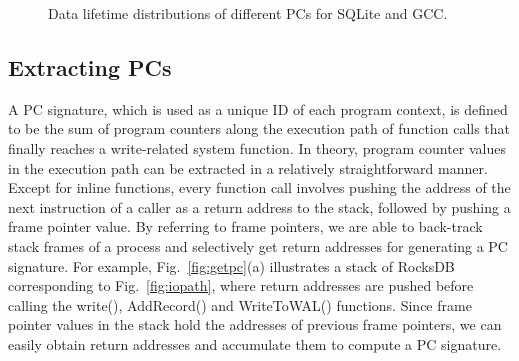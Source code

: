 \begin{figure}[t]
\centering
\hfill
	\hspace{2pt}
\hfill
\vspace{7pt}
	\hspace{2pt}
\caption{Data lifetime distributions of different PCs for SQLite and GCC.} 
\label{fig:updating_PCs}
\end{figure}


\subsection{Extracting PCs}
A PC signature, which is used as a unique ID of each program context,
is defined
to be the sum of program counters along the execution path of function calls
that finally reaches a write-related system function.  In theory, program
counter values in the execution path can be extracted in a relatively
straightforward manner.  Except for inline functions, every function call
involves pushing the address of the next instruction of a caller as a return
address to the stack, followed by pushing a frame pointer value.  By referring
to frame pointers, we are able to back-track stack frames of a process and
selectively get return addresses for generating a PC signature.
For example, Fig.~\ref{fig:getpc}(a) illustrates a stack of RocksDB corresponding
to Fig.~\ref{fig:iopath}, where return addresses are pushed before calling
the \textsf{\small  write()}, \textsf{\small AddRecord()} and \textsf{\small
WriteToWAL()} functions.  Since frame pointer values in the stack hold the
addresses of previous frame pointers, we can easily obtain return addresses and
accumulate them to compute a PC signature.  


